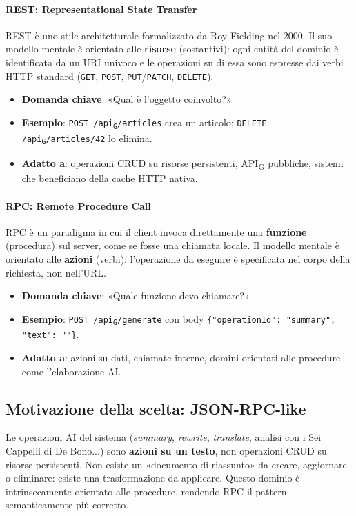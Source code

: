 \documentclass[11pt,a4paper]{article}
\newcommand{\gls}[1]{#1\textsubscript{G}}
\begin{document}
\paragraph{REST: Representational State Transfer}
REST è uno stile architetturale formalizzato da Roy Fielding nel 2000. Il suo modello mentale è orientato alle \textbf{risorse} (sostantivi): ogni entità del dominio è identificata da un URI univoco e le operazioni su di essa sono espresse dai verbi HTTP standard
(\texttt{GET}, \texttt{POST}, \texttt{PUT}/\texttt{PATCH}, \texttt{DELETE}).
\begin{itemize}
    \item \textbf{Domanda chiave}: «Qual è l'oggetto coinvolto?»
    \item \textbf{Esempio}: \texttt{POST /\gls{api}/articles} crea un articolo; \texttt{DELETE /\gls{api}/articles/42} lo elimina.
    \item \textbf{Adatto a}: operazioni CRUD su risorse persistenti, \gls{API} pubbliche, sistemi che beneficiano della cache HTTP nativa.
\end{itemize}

\paragraph{RPC: Remote Procedure Call}
RPC è un paradigma in cui il client invoca direttamente una \textbf{funzione} (procedura) sul server, come se fosse una chiamata locale. Il modello mentale è orientato alle \textbf{azioni} (verbi): l'operazione da eseguire è specificata nel corpo della richiesta, non nell'URL.
\begin{itemize}
    \item \textbf{Domanda chiave}: «Quale funzione devo chiamare?»
    \item \textbf{Esempio}: \texttt{POST /\gls{api}/generate} con body
    \texttt{\{"operationId": "summary", "text": ""\}}.
    \item \textbf{Adatto a}: azioni su dati, chiamate interne, domini orientati alle procedure come l'elaborazione AI.
\end{itemize}

\subsection{Motivazione della scelta: JSON-RPC-like}
Le operazioni AI del sistema (\textit{summary}, \textit{rewrite}, \textit{translate}, analisi con i Sei Cappelli di De Bono...) sono \textbf{azioni su un testo}, non operazioni CRUD su risorse persistenti. Non esiste un «documento di riassunto» da creare, aggiornare o eliminare: esiste una trasformazione da applicare. Questo dominio è intrinsecamente orientato alle procedure, rendendo RPC il pattern semanticamente più corretto.
\end{document}
